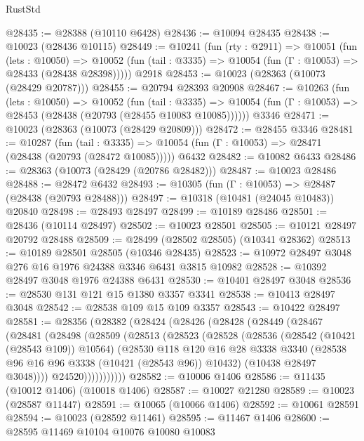 \begin{lexlean}{RustStd}
\begin{coremodule}
@28435 := @28388 (@10110 @6428)
@28436 := @10094 @28435
@28438 := @10023 (@28436 @10115)
@28449 := @10241
    (fun (rty : @2911) =>
    @10051
      (fun (lets : @10050) =>
      @10052 (fun (tail : @3335) => @10054 (fun (Γ : @10053) => @28433 (@28438 @28398)))))
    @2918
@28453 := @10023 (@28363 (@10073 (@28429 @20787)))
@28455 := @20794 @28393 @20908
@28467 := @10263
    (fun (lets : @10050) =>
    @10052
      (fun (tail : @3335) =>
      @10054 (fun (Γ : @10053) => @28453 (@28438 (@20793 (@28455 @10083 @10085))))))
    @3346
@28471 := @10023 (@28363 (@10073 (@28429 @20809)))
@28472 := @28455 @3346
@28481 := @10287
    (fun (tail : @3335) => @10054 (fun (Γ : @10053) => @28471 (@28438 (@20793 (@28472 @10085)))))
    @6432
@28482 := @10082 @6433
@28486 := @28363 (@10073 (@28429 (@20786 @28482)))
@28487 := @10023 @28486
@28488 := @28472 @6432
@28493 := @10305 (fun (Γ : @10053) => @28487 (@28438 (@20793 @28488)))
@28497 := @10318 (@10481 (@24045 @10483)) @20840
@28498 := @28493 @28497
@28499 := @10189 @28486
@28501 := @28436 (@10114 @28497)
@28502 := @10023 @28501
@28505 := @10121 @28497 @20792 @28488
@28509 := @28499 (@28502 @28505) (@10341 @28362)
@28513 := @10189 @28501 @28505 (@10346 @28435)
@28523 := @10972 @28497 @3048 @276 @16 @1976 @24388 @3346 @6431 @3815 @10982
@28528 := @10392 @28497 @3048 @1976 @24388 @6431
@28530 := @10401 @28497 @3048
@28536 := @28530 @131 @121 @15 @1380 @3357 @3341
@28538 := @10413 @28497 @3048
@28542 := @28538 @109 @15 @109 @3357
@28543 := @10422 @28497
@28581 := @28356
    (@28382
      (@28424
        (@28426
          (@28428
            (@28449
              (@28467
                (@28481
                  (@28498
                    (@28509
                      (@28513
                        (@28523
                          (@28528
                            (@28536
                              (@28542 (@10421 (@28543 @109)) @10564)
                              (@28530
                                @118
                                @120
                                @16
                                @28
                                @3338
                                @3340
                                (@28538 @96 @16 @96 @3338 (@10421 (@28543 @96)) @10432)
                                (@10438 @28497 @3048))))
                          @24520)))))))))))
@28582 := @10006 @1406
@28586 := @11435 (@10012 @1406) (@10018 @1406)
@28587 := @10027 @21280
@28589 := @10023 (@28587 @11447)
@28591 := @10065 (@10066 @1406)
@28592 := @10061 @28591
@28594 := @10023 (@28592 @11461)
@28595 := @11467 @1406
@28600 := @28595 @11469 @10104 @10076 @10080 @10083

\end{coremodule}
\end{lexlean}

